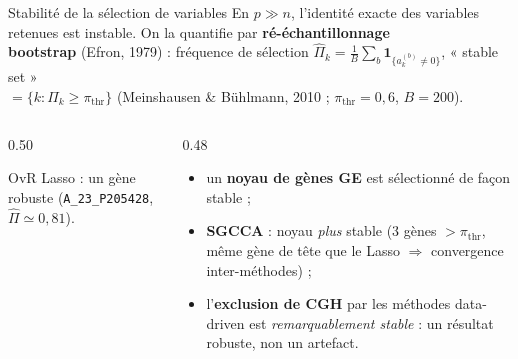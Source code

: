 \documentclass[aspectratio=169, 10pt]{beamer}
\begin{document}
\begin{frame}{Stabilité de la sélection de variables}
  En $p \gg n$, l’identité exacte des variables retenues est instable. On la quantifie par \textbf{ré-échantillonnage\\
    bootstrap} (Efron, 1979) : fréquence de sélection $\hat{\Pi}_k = \frac{1}{B} \sum_b \mathbf{1}_{\{a_k^{(b)} \ne 0\}}$, « stable set »\\
  $= \{k : \hat{\Pi}_k \ge \pi_{\text{thr}}\}$ (Meinshausen \& Bühlmann, 2010 ; $\pi_{\text{thr}} = 0{,}6$, $B = 200$).

  \bigskip
  \begin{columns}[T]
    \begin{column}{0.50\textwidth}
      \centering
      \vskip 2pt
        {\footnotesize OvR Lasso : un gène robuste (\texttt{A\_23\_P205428}, $\hat{\Pi} \simeq 0{,}81$).}
    \end{column}

    \begin{column}{0.48\textwidth}
      \begin{itemize}
        \item un \textbf{noyau de gènes GE} est sélectionné de façon stable ;
        \item \textbf{SGCCA} : noyau \textit{plus} stable (3 gènes $> \pi_{\text{thr}}$, même gène de tête que le Lasso $\Rightarrow$ convergence inter-méthodes) ;
        \item l’\textbf{exclusion de CGH} par les méthodes data-driven est \textit{remarquablement stable} : un résultat robuste, non un artefact.
      \end{itemize}
    \end{column}
  \end{columns}
\end{frame}
\end{document}
